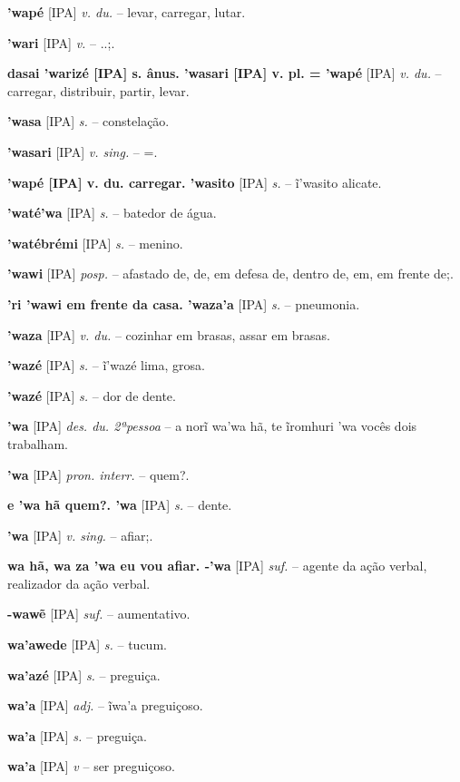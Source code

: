 \textbf{'wapé} [IPA] \textit{v. du.} -- levar, carregar, lutar.

\textbf{'wari} [IPA] \textit{v.} -- ..;.

\textbf{dasai 'warizé [IPA] s. ânus. 'wasari [IPA] v. pl. = 'wapé} [IPA] \textit{v. du.} -- carregar, distribuir, partir, levar.

\textbf{'wasa} [IPA] \textit{s.} -- constelação.

\textbf{'wasari} [IPA] \textit{v. sing.} -- =.

\textbf{'wapé [IPA] v. du. carregar. 'wasito} [IPA] \textit{s.} -- ĩ'wasito alicate.

\textbf{'waté'wa} [IPA] \textit{s.} -- batedor de água.

\textbf{'watébrémi} [IPA] \textit{s.} -- menino. \href{https://xavante.pythonanywhere.com/static/dicionario/play.html?file=boy.wav}{\faHeadphones}

\textbf{'wawi} [IPA] \textit{posp.} -- afastado de, de, em defesa de, dentro de, em, em frente de;.

\textbf{'ri 'wawi em frente da casa. 'waza'a} [IPA] \textit{s.} -- pneumonia.

\textbf{'waza} [IPA] \textit{v. du.} -- cozinhar em brasas, assar em brasas.

\textbf{'wazé} [IPA] \textit{s.} -- ĩ'wazé lima, grosa.

\textbf{'wazé} [IPA] \textit{s.} -- dor de dente.

\textbf{'wa} [IPA] \textit{des. du. 2ªpessoa} -- a norĩ wa'wa hã, te ĩromhuri 'wa vocês dois trabalham.

\textbf{'wa} [IPA] \textit{pron. interr.} -- quem?.

\textbf{e 'wa hã quem?. 'wa} [IPA] \textit{s.} -- dente.

\textbf{'wa} [IPA] \textit{v. sing.} -- afiar;.

\textbf{wa hã, wa za 'wa eu vou afiar. -'wa} [IPA] \textit{suf.} -- agente da ação verbal, realizador da ação verbal.

\textbf{-wawẽ} [IPA] \textit{suf.} -- aumentativo.

\textbf{wa'awede} [IPA] \textit{s.} -- tucum.

\textbf{wa'azé} [IPA] \textit{s.} -- preguiça.

\textbf{wa'a} [IPA] \textit{adj.} -- ĩwa'a preguiçoso.

\textbf{wa'a} [IPA] \textit{s.} -- preguiça.

\textbf{wa'a} [IPA] \textit{v} -- {ser preguiçoso}.

